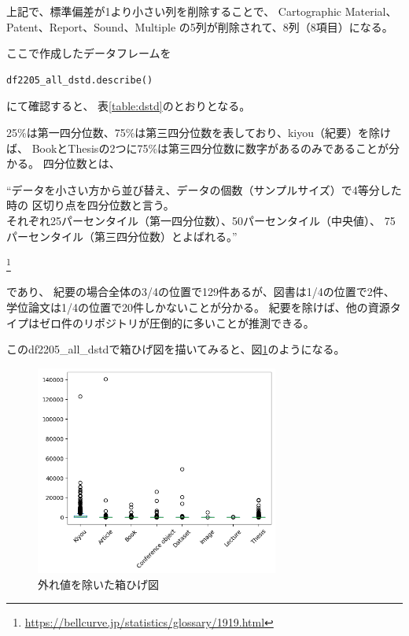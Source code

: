 \documentclass[submit,noauthor]{ono}
\begin{document}
上記で、標準偏差が1より小さい列を削除することで、
Cartographic Material、Patent、Report、Sound、Multiple
の5列が削除されて、8列（8項目）になる。

ここで作成したデータフレームを

\begin{lstlisting}[language=Python,breaklines]
	df2205_all_dstd.describe()
\end{lstlisting}

にて確認すると、
表\ref{table:dstd}のとおりとなる。

25\%は第一四分位数、75\%は第三四分位数を表しており、kiyou（紀要）を除けば、
BookとThesisの2つに75\%は第三四分位数に数字があるのみであることが分かる。
四分位数とは、

“データを小さい方から並び替え、データの個数（サンプルサイズ）で4等分した時の
区切り点を四分位数と言う。\\
それぞれ25パーセンタイル（第一四分位数）、50パーセンタイル（中央値）、
75パーセンタイル（第三四分位数）とよばれる。”

\footnote{\url{https://bellcurve.jp/statistics/glossary/1919.html}}

であり、
紀要の場合全体の3/4の位置で129件あるが、図書は1/4の位置で2件、
学位論文は1/4の位置で20件しかないことが分かる。
紀要を除けば、他の資源タイプはゼロ件のリポジトリが圧倒的に多いことが推測できる。

このdf2205\_all\_dstdで箱ひげ図を描いてみると、図\ref{fig:box1}のようになる。

\begin{figure}[h]
	\includegraphics[width=8cm]{./picture/df2205alldstdboxplot.png}
	\caption{外れ値を除いた箱ひげ図}
	\label{fig:box1}
\end{figure}
\end{document}
